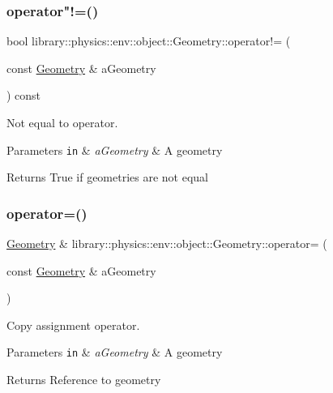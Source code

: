 \subsubsection{\texorpdfstring{operator"!=()}{operator!=()}}
{\footnotesize\ttfamily bool library\+::physics\+::env\+::object\+::\+Geometry\+::operator!= (\begin{DoxyParamCaption}\item[{const \hyperlink{classlibrary_1_1physics_1_1env_1_1object_1_1_geometry}{Geometry} \&}]{a\+Geometry }\end{DoxyParamCaption}) const}



Not equal to operator. 


\begin{DoxyParams}[1]{Parameters}
\mbox{\tt in}  & {\em a\+Geometry} & A geometry \\
\hline
\end{DoxyParams}
\begin{DoxyReturn}{Returns}
True if geometries are not equal 
\end{DoxyReturn}
\mbox{\label{classlibrary_1_1physics_1_1env_1_1object_1_1_geometry_ac2c0d8cbdf9a6828fdd05024fc6ddad7}} 
\subsubsection{\texorpdfstring{operator=()}{operator=()}}
{\footnotesize\ttfamily \hyperlink{classlibrary_1_1physics_1_1env_1_1object_1_1_geometry}{Geometry} \& library\+::physics\+::env\+::object\+::\+Geometry\+::operator= (\begin{DoxyParamCaption}\item[{const \hyperlink{classlibrary_1_1physics_1_1env_1_1object_1_1_geometry}{Geometry} \&}]{a\+Geometry }\end{DoxyParamCaption})}



Copy assignment operator. 


\begin{DoxyParams}[1]{Parameters}
\mbox{\tt in}  & {\em a\+Geometry} & A geometry \\
\hline
\end{DoxyParams}
\begin{DoxyReturn}{Returns}
Reference to geometry 
\end{DoxyReturn}
\mbox{\label{classlibrary_1_1physics_1_1env_1_1object_1_1_geometry_a30698963aff142ce94be27205e4ace24}} 
